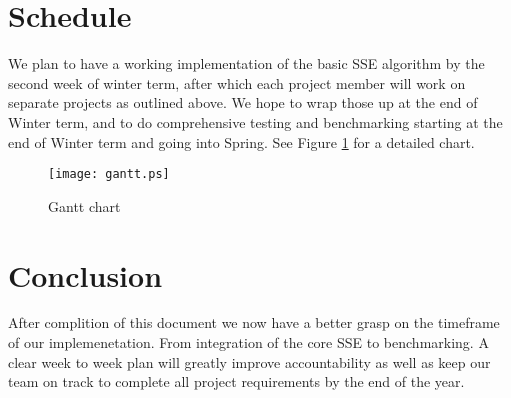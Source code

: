 \documentclass[onecolumn, draftclsnofoot,10pt, compsoc]{IEEEtran}
\begin{document}




\section {Schedule}

We plan to have a working implementation of the basic SSE algorithm by the second week of winter term, after which each project member will work on separate projects as outlined above.
We hope to wrap those up at the end of Winter term, and to do comprehensive testing and benchmarking starting at the end of Winter term and going into Spring.
See Figure \ref{figure:gantt} for a detailed chart.

\begin{figure}
\centering
\texttt{[image: gantt.ps]}
\caption{Gantt chart}
\label{figure:gantt}
\end{figure}



    
    
    


\section{ Conclusion }
After complition of this document we now have a better grasp on the timeframe of our implemenetation. From integration of the core SSE to benchmarking. A clear week to week plan will greatly improve accountability as well as keep our team on track to complete all project requirements by the end of the year. 

{}
\end{document}
